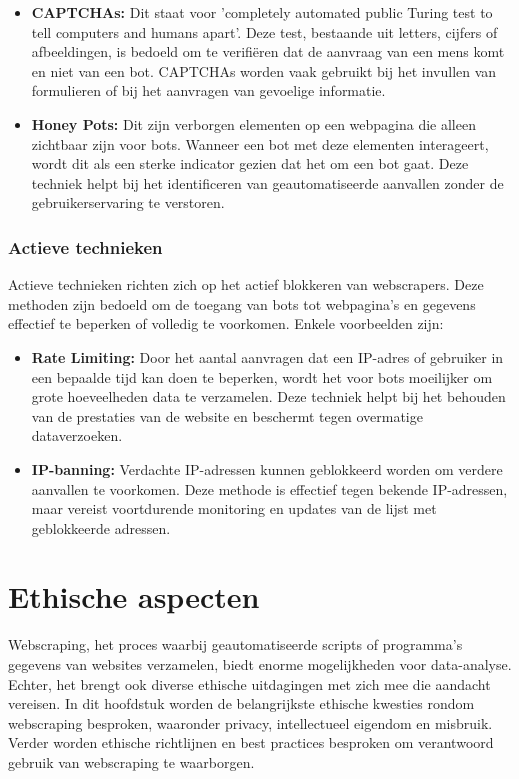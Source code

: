 \begin{itemize}
    \item \textbf{CAPTCHAs: } Dit staat voor 'completely automated public Turing test to tell computers and humans apart'. Deze  test, bestaande uit letters, cijfers of afbeeldingen, is bedoeld om te verifiëren dat de aanvraag van een mens komt en niet van een bot. CAPTCHAs worden vaak gebruikt bij het invullen van formulieren of bij het aanvragen van gevoelige informatie.

    \item \textbf{Honey Pots:} Dit zijn verborgen elementen op een webpagina die alleen zichtbaar zijn voor bots. Wanneer een bot met deze elementen interageert, wordt dit als een sterke indicator gezien dat het om een bot gaat. Deze techniek helpt bij het identificeren van geautomatiseerde aanvallen zonder de gebruikerservaring te verstoren.
\end{itemize}

\subsubsection{Actieve technieken}
Actieve technieken richten zich op het actief blokkeren van webscrapers. Deze methoden zijn bedoeld om de toegang van bots tot webpagina's en gegevens effectief te beperken of volledig te voorkomen. Enkele voorbeelden zijn:

\begin{itemize}
    \item \textbf{Rate Limiting:} Door het aantal aanvragen dat een IP-adres of gebruiker in een bepaalde tijd kan doen te beperken, wordt het voor bots moeilijker om grote hoeveelheden data te verzamelen. Deze techniek helpt bij het behouden van de prestaties van de website en beschermt tegen overmatige dataverzoeken.
    \item \textbf{IP-banning:} Verdachte IP-adressen kunnen geblokkeerd worden om verdere aanvallen te voorkomen. Deze methode is effectief tegen bekende IP-adressen, maar vereist voortdurende monitoring en updates van de lijst met geblokkeerde adressen.
\end{itemize}

\section{Ethische aspecten}
Webscraping, het proces waarbij geautomatiseerde scripts of programma's gegevens van websites verzamelen, biedt enorme mogelijkheden voor data-analyse. Echter, het brengt ook diverse ethische uitdagingen met zich mee die aandacht vereisen. In dit hoofdstuk worden de belangrijkste ethische kwesties rondom webscraping besproken, waaronder privacy, intellectueel eigendom en misbruik. Verder worden ethische richtlijnen en best practices besproken om verantwoord gebruik van webscraping te waarborgen.

